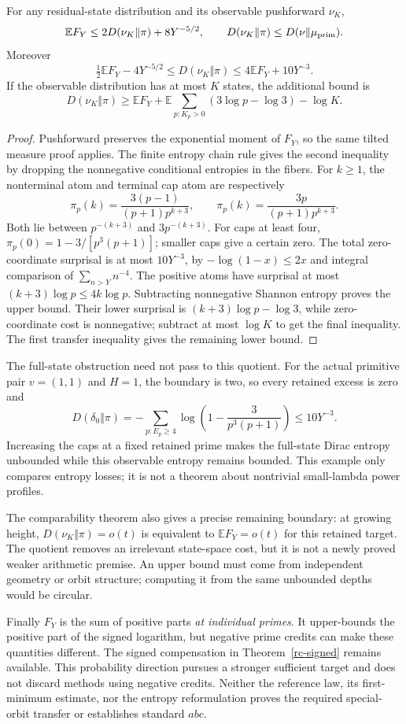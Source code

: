 \begin{theorem}\label{om-observable}
For any residual-state distribution and its observable pushforward $\nu_K$,
\[
 \mathbb E F_Y\le2D(\nu_K\Vert\pi)+8Y^{-5/2},\qquad
 D(\nu_K\Vert\pi)\le D(\nu\Vert\mu_{\rm prim}).
\]
Moreover
\[
 \tfrac12\mathbb E F_Y-4Y^{-5/2}
 \le D(\nu_K\Vert\pi)\le4\mathbb E F_Y+10Y^{-3}.
\]
If the observable distribution has at most $K$ states, the additional bound is
\[
 D(\nu_K\Vert\pi)\ge\mathbb E F_Y+
 \mathbb E\sum_{p:K_p>0}(3\log p-\log3)-\log K.
\]
\end{theorem}
\begin{proof}
Pushforward preserves the exponential moment of $F_Y$, so the same tilted
measure proof applies. The finite entropy chain rule gives the second
inequality by dropping the nonnegative conditional entropies in the fibers.
For $k\ge1$, the nonterminal atom and terminal cap atom are respectively
\[
 \pi_p(k)=\frac{3(p-1)}{(p+1)p^{k+3}},\qquad
 \pi_p(k)=\frac{3p}{(p+1)p^{k+3}}.
\]
Both lie between $p^{-(k+3)}$ and $3p^{-(k+3)}$.
For caps at least four, $\pi_p(0)=1-3/[p^3(p+1)]$; smaller caps give a
certain zero. The total zero-coordinate surprisal is at most $10Y^{-3}$,
by $-\log(1-x)\le2x$ and integral comparison of $\sum_{n>Y}n^{-4}$.
The positive atoms have surprisal at most $(k+3)\log p\le4k\log p$.
Subtracting nonnegative Shannon entropy proves the upper bound.
Their lower surprisal is $(k+3)\log p-\log3$, while zero-coordinate
cost is nonnegative; subtract at most $\log K$ to get the final inequality.
The first transfer inequality gives the remaining lower bound.
\end{proof}

The full-state obstruction need not pass to this quotient. For the actual
primitive pair $v=(1,1)$ and $H=1$, the boundary is two, so every retained
excess is zero and
\[
 D(\delta_0\Vert\pi)=
 -\sum_{p:E_p\ge4}\log\left(1-\frac3{p^3(p+1)}\right)\le10Y^{-3}.
\]
Increasing the caps at a fixed retained prime makes the full-state Dirac
entropy unbounded while this observable entropy remains bounded. This example
only compares entropy losses; it is not a theorem about nontrivial
small-lambda power profiles.

The comparability theorem also gives a precise remaining boundary:
at growing height, $D(\nu_K\Vert\pi)=o(t)$ is equivalent to
$\mathbb E F_Y=o(t)$ for this retained target. The quotient removes an
irrelevant state-space cost, but it is not a newly proved weaker arithmetic
premise. An upper bound must come from independent geometry or orbit structure;
computing it from the same unbounded depths would be circular.

Finally $F_Y$ is the sum of positive parts \emph{at individual primes}.
It upper-bounds the positive part of the signed logarithm, but negative
prime credits can make these quantities different. The signed compensation
in Theorem~\ref{rc-signed} remains available. This probability direction
pursues a stronger sufficient target and does not discard methods using
negative credits. Neither the reference law, its first-minimum estimate,
nor the entropy reformulation proves the required special-orbit transfer
or establishes standard $abc$.
